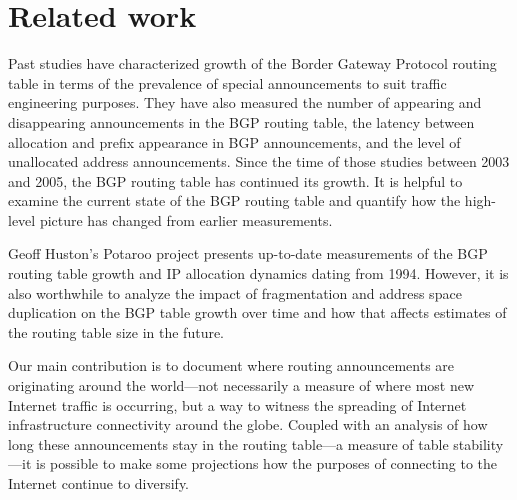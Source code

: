 \section{Related work}
\label{sec:related_work}

Past studies \cite{Meng:2005:IPv4-address} \cite{Xu:2003:IPv4-Address}
\cite{Meng:2003:An-analysis-of-BGP-routing} have characterized growth of the
Border Gateway Protocol routing table in terms of the prevalence of special
announcements to suit traffic engineering purposes. They have also measured the
number of appearing and disappearing announcements in the BGP routing table,
the latency between allocation and prefix appearance in BGP announcements, and
the level of unallocated address announcements. Since the time of those studies
between 2003 and 2005, the BGP routing table has continued its growth. It is
helpful to examine the current state of the BGP routing table and quantify how
the high-level picture has changed from earlier measurements.

Geoff Huston's Potaroo project \cite{::IPv4-Address-Report} presents up-to-date
measurements of the BGP routing table growth and IP allocation dynamics dating
from 1994. However, it is also worthwhile to analyze the impact of
fragmentation and address space duplication on the BGP table growth over time
and how that affects estimates of the routing table size in the future.

Our main contribution is to document where routing announcements are
originating around the world---not necessarily a measure of where most new
Internet traffic is occurring, but a way to witness the spreading of Internet
infrastructure connectivity around the globe. Coupled with an analysis of how
long these announcements stay in the routing table---a measure of table
stability---it is possible to make some projections how the purposes of
connecting to the Internet continue to diversify.

